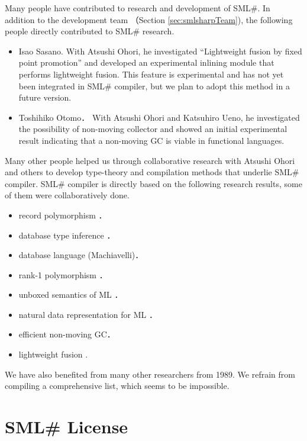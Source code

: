 \documentclass{jbook}
\newcommand{\txt}[2]{#2}
\newcommand{\smlsharp}{SML\#}
\begin{document}
	Many people have contributed to research and development of
\smlsharp{}.
	In addition to the development team （Section
\ref{sec:smlsharpTeam}),  the following people directly contributed to 
\smlsharp{} research.
\begin{itemize}
\item Isao Sasano.
With Atsushi Ohori, he investigated 
``Lightweight fusion by fixed point promotion'' and 
developed an experimental inlining module that performs lightweight
fusion.
	This feature is experimental and has not yet been integrated in
\smlsharp{} compiler, but we plan to adopt this method in a future
version.
\item Toshihiko Otomo．
	With Atsushi Ohori and Katsuhiro Ueno, he investigated the
possibility of non-moving collector and showed an initial experimental
result indicating that a non-moving GC is viable in functional
languages.
\end{itemize}
	Many other people helped us through collaborative research with
Atsushi Ohori and others to develop type-theory and compilation methods
that underlie \smlsharp{} compiler.
	\smlsharp{} compiler is directly based on the
following research results, some of them were collaboratively done.
\begin{itemize}
\item record polymorphism \cite{ohor92popl,ohor95toplas}．
\item database type inference \cite{ohor88lfp}．
\item database language (Machiavelli)\cite{ohor89sigmod,bune96tods}．
\item rank-1 polymorphism \cite{ohor99icfp}．
\item unboxed semantics of ML \cite{ohor97unbox}．
\item natural data representation for ML \cite{nguyen06ppdp}．
\item efficient non-moving GC\cite{ueno11icfp}．
\item lightweight fusion \cite{ohor07popl}.
\end{itemize}
	We have also benefited from many other researchers from 1989.
	We refrain from compiling a comprehensive list, which seems to
be impossible. 
\fi%

\section{\txt{\smlsharp{}ライセンス}{\smlsharp{} License}}
\label{sec:smlsharpLicence}
\end{document}
